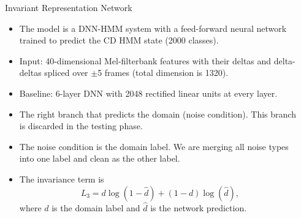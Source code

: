 \documentclass[final]{beamer}
\newlength{\sepwid}
\newlength{\onecolwid}
\newlength{\twocolwid}
\begin{document}
\begin{frame}[t]
\begin{columns}[t]
\begin{column}{\twocolwid}
\begin{columns}[t]
\begin{column}{\onecolwid}
\begin{block}{{\Large Invariant Representation Network}}
                \begin{itemize}
                    \item The model is a DNN-HMM system with a feed-forward neural network trained to predict the 
                        CD HMM state (2000 classes).
                    \item Input: 40-dimensional Mel-filterbank features with their deltas and 
                        delta-deltas spliced over $\pm$5 frames (total dimension is 1320).
                    \item Baseline: 6-layer DNN with 2048 rectified linear units at every layer.
                    \item The right branch that predicts the domain (noise condition). This branch is discarded 
                        in the testing phase. 
                    \item The noise condition is the domain label. We are merging all noise types into one label
                        and clean as the other label.
                    \item The invariance term is
                        \begin{equation*}
                            L_3 = d\log(1 - \hat{d}) + (1-d)\log(\hat{d}),
                        \end{equation*}
                        where $d$ is the domain label and $\hat{d}$ is the network prediction.
                \end{itemize}
            \end{block}

        \end{column} %

        \begin{column}{\sepwid}\end{column} %


\end{columns}
\end{column}
\end{columns}
\end{frame}
\end{document}

